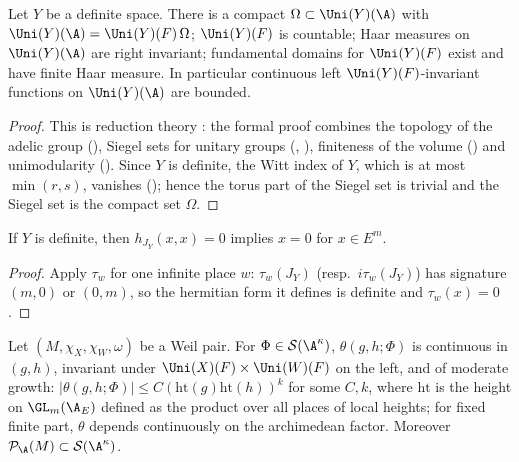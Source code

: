 \begin{proposition}\label{pf:tlift:cpt}
Let $Y$ be a definite space. There is a compact $\Omega\subset\Uni(Y)(\A)$ with
$\Uni(Y)(\A)=\Uni(Y)(F)\,\Omega$; $\Uni(Y)(F)$ is countable; Haar measures on $\Uni(Y)(\A)$ are right invariant;
fundamental domains for $\Uni(Y)(F)$ exist and have finite Haar measure. In particular continuous left
$\Uni(Y)(F)$-invariant functions on $\Uni(Y)(\A)$ are bounded.
\end{proposition}

\begin{proof}
This is reduction theory \cite{Borel1969,PlatonovRapinchuk1994}: the formal proof combines the topology of
the adelic group (), Siegel sets for unitary groups
(, ),
finiteness of the volume () and unimodularity
(). Since $Y$ is definite, the Witt index of $Y$, which is at most
$\min(r,s)$, vanishes (); hence the torus part of the Siegel set is trivial
and the Siegel set is the compact set $\Omega$.
\end{proof}

\begin{lemma}[Anisotropy]\label{pf:tlift:aniso}
If $Y$ is definite, then $h_{J_Y}(x,x)=0$ implies $x=0$ for $x\in E^m$.
\end{lemma}

\begin{proof}
Apply $\tau_w$ for one infinite place $w$: $\tau_w(J_Y)$ (resp.\ $i\tau_w(J_Y)$) has signature $(m,0)$ or $(0,m)$,
so the hermitian form it defines is definite and $\tau_w(x)=0$.
\end{proof}

\begin{proposition}\label{pf:tlift:basic}
Let $(M,\chi_X,\chi_W,\omega)$ be a Weil pair. For $\Phi\in\tliftS(\A^\kappa)$, $\theta(g,h;\Phi)$ is continuous in
$(g,h)$, invariant under $\Uni(X)(F)\times\Uni(W)(F)$ on the left, and of moderate growth:
$|\theta(g,h;\Phi)|\le C(\mathrm{ht}(g)\mathrm{ht}(h))^k$ for some $C,k$, where $\mathrm{ht}$ is the height on
$\GL_m(\tliftAE)$ defined as the product over all places of local heights; for fixed finite part,
$\theta$ depends continuously on the archimedean factor. Moreover $\tliftPD(M)\subset\tliftS(\A^\kappa)$.
\end{proposition}

